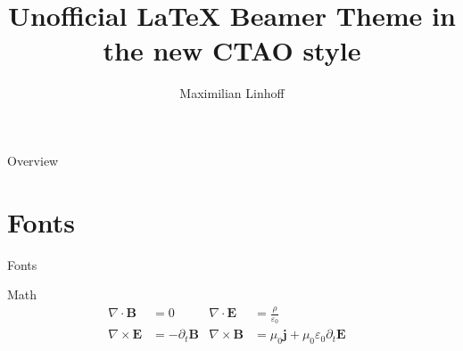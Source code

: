 \documentclass[aspectratio=1610, 9pt]{beamer}
\title{Unofficial LaTeX Beamer Theme in the new CTAO style}
\author[M.~Linhoff]{Maximilian Linhoff}
\institute[TU Dortmund]{TU Dortmund}
\begin{document}
\maketitle

\begin{frame}{Overview}
  \tableofcontents
\end{frame}

\section{Fonts}
\begin{frame}{Fonts}
\end{frame}

\begin{frame}{Math}
  \begin{align*}
    \nabla \cdot \symbf{B} &= 0 &
    \nabla \cdot \symbf{E} &= \frac{ρ}{ε_0} \\
    \nabla \times \symbf{E} &= -\partial_t \symbf{B} &
    \nabla \times \symbf{B} &= μ_0 \symbf{j} + μ_0 ε_0 \partial_t \symbf{E} &
  \end{align*}
\end{frame}
\end{document}
